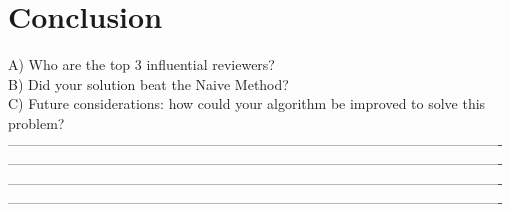 \documentclass[11pt]{scrartcl} %
\begin{document}
\section{Conclusion}
A) Who are the top 3 influential reviewers?\\
B) Did your solution beat the Naive Method?\\
C) Future considerations: how could your algorithm be improved to solve this problem?\\
----------------------------------------------------------------------------------------------------------\\
----------------------------------------------------------------------------------------------------------\\
----------------------------------------------------------------------------------------------------------\\
----------------------------------------------------------------------------------------------------------\\
%
%
\end{document}

